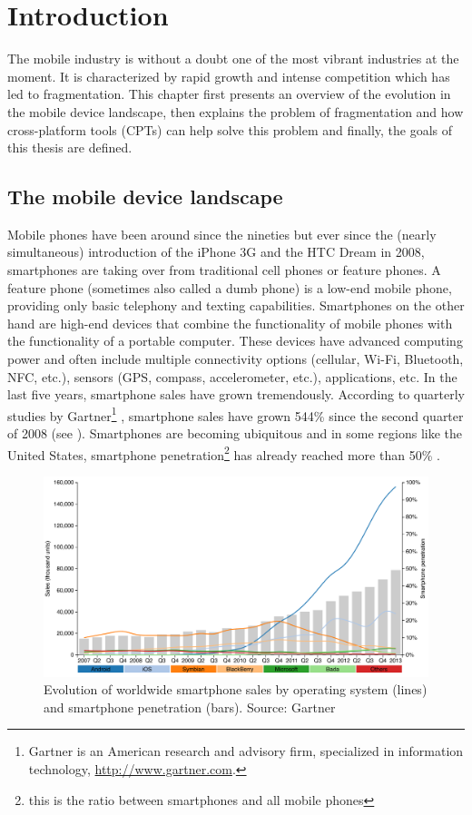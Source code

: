 \chapter{Introduction}
\label{cha:intro}

The mobile industry is without a doubt one of the most vibrant industries at the moment. It is characterized by rapid growth and intense competition which has led to fragmentation. This chapter first presents an overview of the evolution in the mobile device landscape, then explains the problem of fragmentation and how cross-platform tools (CPTs) can help solve this problem and finally, the goals of this thesis are defined.

\section{The mobile device landscape}

Mobile phones have been around since the nineties but ever since the (nearly simultaneous) introduction of the iPhone 3G and the HTC Dream in 2008, smartphones are taking over from traditional cell phones or feature phones. A feature phone (sometimes also called a dumb phone) is a low-end mobile phone, providing only basic telephony and texting capabilities. Smartphones on the other hand are high-end devices that combine the functionality of mobile phones with the functionality of a portable computer. These devices have advanced computing power and often include multiple connectivity options (cellular, Wi-Fi, Bluetooth, NFC, etc.), sensors (GPS, compass, accelerometer, etc.), applications, etc. In the last five years, smartphone sales have grown tremendously. According to quarterly studies by Gartner\footnote{Gartner is an American research and advisory firm, specialized in information technology, \url{http://www.gartner.com}.} \citeGartner, smartphone sales have grown 544\% since the second quarter of 2008 (see ). Smartphones are becoming ubiquitous and in some regions like the United States, smartphone penetration\footnote{this is the ratio between smartphones and all mobile phones} has already reached more than 50\% \cite{Nielsen:2012}. 

\begin{figure}[h]
    \centering
    \includegraphics[width=\textwidth]{../resources/figs/smartphone_sales.pdf}
    	\caption{Evolution of worldwide smartphone sales by operating system (lines) and smartphone penetration (bars). Source: Gartner \citeGartner}
    	\label{fig:smartphone-sales}
\end{figure}

